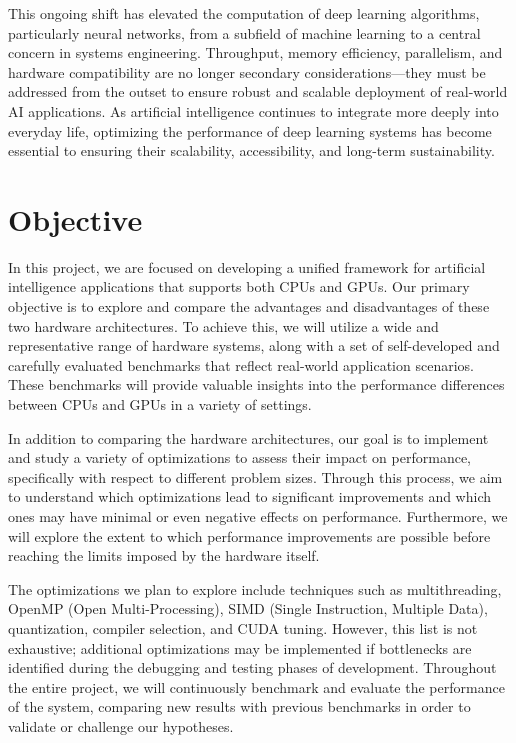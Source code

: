 \documentclass[modern,longauthor]{aastex7}
\begin{document}
This ongoing shift has elevated the computation of deep learning algorithms, particularly neural networks, from a subfield of machine learning to a central concern in systems engineering. Throughput, memory efficiency, parallelism, and hardware compatibility are no longer secondary considerations—they must be addressed from the outset to ensure robust and scalable deployment of real-world AI applications. As artificial intelligence continues to integrate more deeply into everyday life, optimizing the performance of deep learning systems has become essential to ensuring their scalability, accessibility, and long-term sustainability.
\section{Objective}\label{sec:objective}
In this project, we are focused on developing a unified framework for artificial intelligence applications that supports both CPUs and GPUs. Our primary objective is to explore and compare the advantages and disadvantages of these two hardware architectures. To achieve this, we will utilize a wide and representative range of hardware systems, along with a set of self-developed and carefully evaluated benchmarks that reflect real-world application scenarios. These benchmarks will provide valuable insights into the performance differences between CPUs and GPUs in a variety of settings.

In addition to comparing the hardware architectures, our goal is to implement and study a variety of optimizations to assess their impact on performance, specifically with respect to different problem sizes. Through this process, we aim to understand which optimizations lead to significant improvements and which ones may have minimal or even negative effects on performance. Furthermore, we will explore the extent to which performance improvements are possible before reaching the limits imposed by the hardware itself.

The optimizations we plan to explore include techniques such as multithreading, OpenMP (Open Multi-Processing), SIMD (Single Instruction, Multiple Data), quantization, compiler selection, and CUDA tuning. However, this list is not exhaustive; additional optimizations may be implemented if bottlenecks are identified during the debugging and testing phases of development. Throughout the entire project, we will continuously benchmark and evaluate the performance of the system, comparing new results with previous benchmarks in order to validate or challenge our hypotheses.
\end{document}
